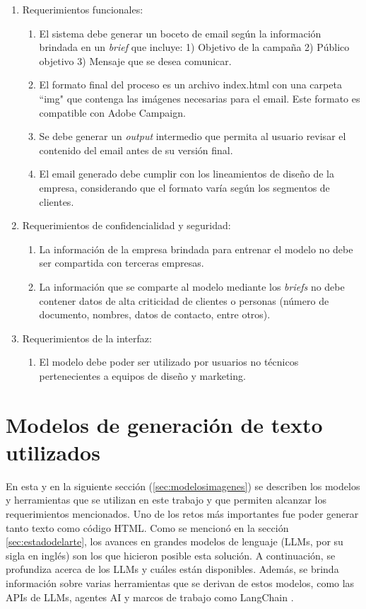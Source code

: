\begin{enumerate}
	\item Requerimientos funcionales:
		\begin{enumerate}
			\item El sistema debe generar un boceto de email según la información brindada en un \textit{brief} que incluye: 1) Objetivo de la campaña 2) Público objetivo 3) Mensaje que se desea comunicar.
			\item El formato final del proceso es un archivo index.html con una carpeta ``img"  que contenga las imágenes necesarias para el email. Este formato es compatible con Adobe Campaign.
			\item Se debe generar un \textit{output} intermedio que permita al usuario revisar el contenido del email antes de su versión final.
			\item El email generado debe cumplir con los lineamientos de diseño de la empresa, considerando que el formato varía según los segmentos de clientes.
		\end{enumerate}
	\item Requerimientos de confidencialidad y seguridad:
		\begin{enumerate}
			\item La información de la empresa brindada para entrenar el modelo no debe ser compartida con terceras empresas.
			\item La información que se comparte al modelo mediante los \textit{briefs} no debe contener datos de alta criticidad de clientes o personas (número de documento, nombres, datos de contacto, entre otros).
		\end{enumerate}
	\item Requerimientos de la interfaz:
		\begin{enumerate}
			\item El modelo debe poder ser utilizado por usuarios no técnicos pertenecientes a equipos de diseño y marketing.
		\end{enumerate}
\end{enumerate}

\section{Modelos de generación de texto utilizados}

En esta y en la siguiente sección (\ref{sec:modelosimagenes}) se describen los modelos y herramientas que se utilizan en este trabajo y que permiten alcanzar los requerimientos mencionados. Uno de los retos más importantes fue poder generar tanto texto como código HTML. Como se mencionó en la sección \ref{sec:estadodelarte}, los avances en grandes modelos de lenguaje (LLMs, por su sigla en inglés) son los que hicieron posible esta solución. A continuación, se profundiza acerca de los LLMs y cuáles están disponibles. Además, se brinda información sobre varias herramientas que se derivan de estos modelos, como las APIs de LLMs, agentes AI y marcos de trabajo como LangChain \cite{langchain}.

